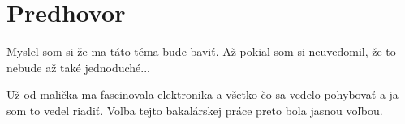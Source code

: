 \chapter*{Predhovor}
\thispagestyle{empty}

Myslel som si že ma táto téma bude baviť. Až pokial som si neuvedomil, že to nebude až také jednoduché... 

Už od malička ma fascinovala elektronika a všetko čo sa vedelo pohybovať a ja som to vedel riadiť. Volba tejto bakalárskej práce preto bola jasnou voľbou. 

\cleardoublepage

